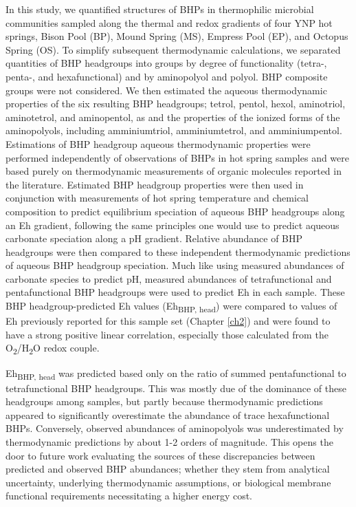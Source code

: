 In this study, we quantified structures of BHPs in thermophilic microbial communities sampled along the thermal and redox gradients of four YNP hot springs, Bison Pool (BP), Mound Spring (MS), Empress Pool (EP), and Octopus Spring (OS). To simplify subsequent thermodynamic calculations, we separated quantities of BHP headgroups into groups by degree of functionality (tetra-, penta-, and hexafunctional) and by aminopolyol and polyol. BHP composite groups were not considered. We then estimated the aqueous thermodynamic properties of the six resulting BHP headgroups; tetrol, pentol, hexol, aminotriol, aminotetrol, and aminopentol, as and the properties of the ionized forms of the aminopolyols, including amminiumtriol, amminiumtetrol, and amminiumpentol. Estimations of BHP headgroup aqueous thermodynamic properties were performed independently of observations of BHPs in hot spring samples and were based purely on thermodynamic measurements of organic molecules reported in the literature. Estimated BHP headgroup properties were then used in conjunction with measurements of hot spring temperature and chemical composition to predict equilibrium speciation of aqueous BHP headgroups along an Eh gradient, following the same principles one would use to predict aqueous carbonate speciation along a pH gradient. Relative abundance of BHP headgroups were then compared to these independent thermodynamic predictions of aqueous BHP headgroup speciation. Much like using measured abundances of carbonate species to predict pH, measured abundances of tetrafunctional and pentafunctional BHP headgroups were used to predict Eh in each sample. These BHP headgroup-predicted Eh values (Eh\textsubscript{BHP, head}) were compared to values of Eh previously reported for this sample set (Chapter \ref{ch2}) and were found to have a strong positive linear correlation, especially those calculated from the O\textsubscript{2}/H\textsubscript{2}O redox couple.

Eh\textsubscript{BHP, head} was predicted based only on the ratio of summed pentafunctional to tetrafunctional BHP headgroups. This was mostly due of the dominance of these headgroups among samples, but partly because thermodynamic predictions appeared to significantly overestimate the abundance of trace hexafunctional BHPs. Conversely, observed abundances of aminopolyols was underestimated by thermodynamic predictions by about 1-2 orders of magnitude. This opens the door to future work evaluating the sources of these discrepancies between predicted and observed BHP abundances; whether they stem from analytical uncertainty, underlying thermodynamic assumptions, or biological membrane functional requirements necessitating a higher energy cost.

